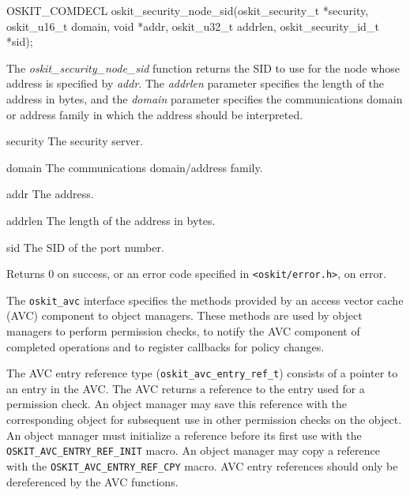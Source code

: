\begin{apisyn}
 
        \funcproto OSKIT_COMDECL
        oskit_security_node_sid(oskit_security_t *security,
                                oskit_u16_t domain,
				void *addr,
				oskit_u32_t addrlen,
                                \outparam oskit_security_id_t *sid);
\end{apisyn}
\begin{apidesc}

The \emph{oskit\_security\_node\_sid} function returns the SID to use for the
node whose address is specified by \emph{addr}.  The \emph{addrlen}
parameter specifies the length of the address in bytes, and the
\emph{domain} parameter specifies the communications domain or address
family in which the address should be interpreted.  

\end{apidesc}
\begin{apiparm}
        \item[security]
                The security server.
        \item[domain]
                The communications domain/address family.
        \item[addr]  
                The address.
        \item[addrlen]
                The length of the address in bytes.
        \item[sid]
                The SID of the port number.
\end{apiparm}
\begin{apiret}
        Returns 0 on success, or an error code specified in
        {\tt <oskit/error.h>}, on error.
\end{apiret}



\label{oskit-avc}

The {\tt oskit_avc} interface specifies the methods provided
by an access vector cache (AVC) component to object managers.  
These methods are used by object managers to perform 
permission checks, to notify the AVC component of completed 
operations and to register callbacks for policy changes.

The AVC entry reference type (\texttt{oskit_avc_entry_ref_t}) consists of a
pointer to an entry in the AVC\@.  The AVC returns a reference to the
entry used for a permission check. An object manager may save this
reference with the corresponding object for subsequent use in other
permission checks on the object.  An object manager must initialize a
reference before its first use with the \texttt{OSKIT_AVC_ENTRY_REF_INIT}
macro.  An object manager may copy a reference with the
\texttt{OSKIT_AVC_ENTRY_REF_CPY} macro.  AVC entry references should
only be dereferenced by the AVC functions.

